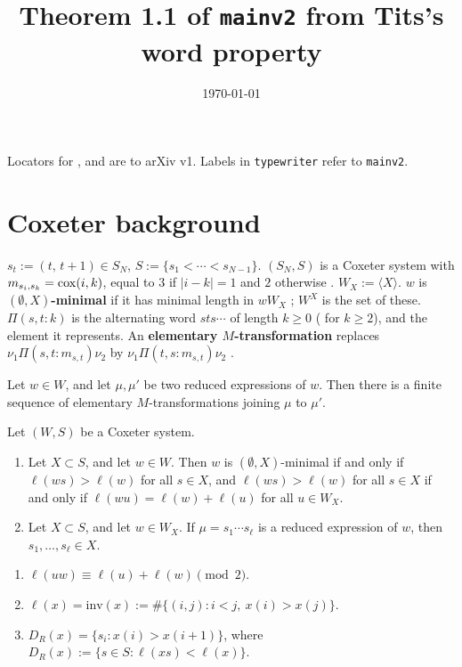 \documentclass[11pt]{article}
\title{Theorem 1.1 of \texttt{mainv2} from Tits's word property}
\date{\today}
\newcommand{\altw}[3]{\Pi(#1,#2:#3)}
\begin{document}
\maketitle

\noindent Locators for \cite{Paris}, \cite{PZ} and \cite{Z2} are to arXiv v1. Labels in \texttt{typewriter} refer to \texttt{mainv2}.

\section{Coxeter background}

$s_t := (t,\,t+1) \in S_N$, $S := \{s_1 < \cdots < s_{N-1}\}$. $(S_N,S)$ is a Coxeter system
\cite[Prop.~1.5.4]{BB} with $m_{s_i,s_k} = \operatorname{cox}(i,k)$, equal to $3$ if $|i-k| = 1$ and $2$ otherwise
\cite[(1.29)]{BB}. $W_X := \langle X\rangle$. $w$ is \textbf{$(\emptyset,X)$-minimal} if it has minimal
length in $wW_X$ \cite[\S2.2]{Paris}; $W^X$ is the set of these. $\altw stk$ is the alternating word
$sts\cdots$ of length $k \ge 0$ (\cite[\S1]{Paris} for $k \ge 2$), and the element it represents. An
\textbf{elementary $M$-transformation} replaces $\nu_1\altw st{m_{s,t}}\nu_2$ by
$\nu_1\altw ts{m_{s,t}}\nu_2$ \cite[\S2.2]{Paris}.

\begin{theorem}\label{thm:tits}
  Let $w \in W$, and let $\mu, \mu'$ be two reduced expressions of $w$. Then there is a finite
  sequence of elementary $M$-transformations joining $\mu$ to $\mu'$.
\end{theorem}

\begin{proposition}\label{prop:min}
  Let $(W,S)$ be a Coxeter system.
  \begin{enumerate}
    \item[(2)] Let $X \subset S$, and let $w \in W$. Then $w$ is $(\emptyset,X)$-minimal if and
      only if $\ell(ws) > \ell(w)$ for all $s \in X$, and $\ell(ws) > \ell(w)$ for all $s \in X$ if
      and only if $\ell(wu) = \ell(w) + \ell(u)$ for all $u \in W_X$.
    \item[(4)] Let $X \subset S$, and let $w \in W_X$. If $\mu = s_1 \cdots s_\ell$ is a reduced
      expression of $w$, then $s_1, \dots, s_\ell \in X$.
  \end{enumerate}
\end{proposition}

\begin{proposition}\label{prop:typeA}
  \begin{enumerate}
    \item \cite[Prop.~1.4.2(ii)]{BB} $\ell(uw) \equiv \ell(u) + \ell(w) \pmod 2$.
    \item \cite[Prop.~1.5.2]{BB} $\ell(x) = \mathrm{inv}(x) := \#\{(i,j) : i < j,\ x(i) > x(j)\}$.
    \item \cite[Prop.~1.5.3]{BB} $D_R(x) = \{s_i : x(i) > x(i+1)\}$, where $D_R(x) := \{s \in S :
      \ell(xs) < \ell(x)\}$.
  \end{enumerate}
\end{proposition}
\end{document}
